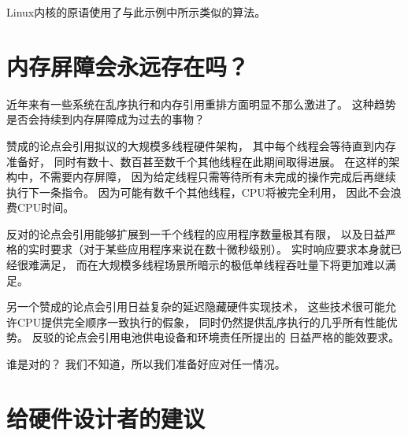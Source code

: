Linux内核的原语使用了与此示例中所示类似的算法。

\section{内存屏障会永远存在吗？}
\label{sec:app:whymb:Are Memory Barriers Forever?}

近年来有一些系统在乱序执行和内存引用重排方面明显不那么激进了。
这种趋势是否会持续到内存屏障成为过去的事物？

赞成的论点会引用拟议的大规模多线程硬件架构，
其中每个线程会等待直到内存准备好，
同时有数十、数百甚至数千个其他线程在此期间取得进展。
在这样的架构中，不需要内存屏障，
因为给定线程只需等待所有未完成的操作完成后再继续执行下一条指令。
因为可能有数千个其他线程，CPU将被完全利用，
因此不会浪费CPU时间。

反对的论点会引用能够扩展到一千个线程的应用程序数量极其有限，
以及日益严格的实时要求（对于某些应用程序来说在数十微秒级别）。
实时响应要求本身就已经很难满足，
而在大规模多线程场景所暗示的极低单线程吞吐量下将更加难以满足。

另一个赞成的论点会引用日益复杂的延迟隐藏硬件实现技术，
这些技术很可能允许CPU提供完全顺序一致执行的假象，
同时仍然提供乱序执行的几乎所有性能优势。
反驳的论点会引用电池供电设备和环境责任所提出的
日益严格的能效要求。

谁是对的？
我们不知道，所以我们准备好应对任一情况。

\section{给硬件设计者的建议}
\label{sec:app:whymb:Advice to Hardware Designers}

